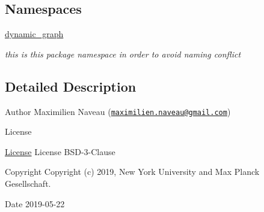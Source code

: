 \subsection*{Namespaces}
\begin{DoxyCompactItemize}
\item 
 \hyperlink{namespacedynamic__graph}{dynamic\+\_\+graph}
\begin{DoxyCompactList}\small\item\em this is this package namespace in order to avoid naming conflict \end{DoxyCompactList}\end{DoxyCompactItemize}


\subsection{Detailed Description}
\begin{DoxyAuthor}{Author}
Maximilien Naveau (\href{mailto:maximilien.naveau@gmail.com}{\tt maximilien.\+naveau@gmail.\+com}) 
\end{DoxyAuthor}
\begin{DoxyRefDesc}{License}
\item[\hyperlink{license__license000004}{License}]License B\+S\+D-\/3-\/\+Clause \end{DoxyRefDesc}
\begin{DoxyCopyright}{Copyright}
Copyright (c) 2019, New York University and Max Planck Gesellschaft. 
\end{DoxyCopyright}
\begin{DoxyDate}{Date}
2019-\/05-\/22 
\end{DoxyDate}
